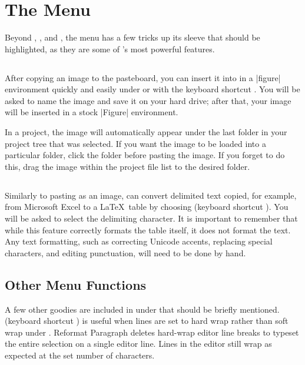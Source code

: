 \section[The Edit Menu]{The  Menu}
\label{reference.editmenu}
Beyond , , and , the  menu has a few tricks up its sleeve that should be highlighted, as they are some of \texnicle's most powerful features.

\subsection[Paste as Image]{}
\label{reference.edit.pasteimg}
After copying an image to the pasteboard, you can insert it into \texnicle in a |figure| environment quickly and easily under  or with the keyboard shortcut . You will be asked to name the image and save it on your hard drive; after that, your image will be inserted in a stock |Figure| environment.

In a project, the image will automatically appear under the last folder in your project tree that was selected. If you want the image to be loaded into a particular folder, click the folder before pasting the image. If you forget to do this, drag the image within the project file list to the desired folder.

\subsection[Paste as Table]{}
\label{reference.edit.pastetab}
Similarly to pasting as an image, \texnicle can convert delimited text copied, for example, from Microsoft Excel to a \LaTeX\ table by choosing  (keyboard shortcut ). You will be asked to select the delimiting character. It is important to remember that while this feature correctly formats the table itself, it does not format the text. Any text formatting, such as correcting Unicode accents, replacing special characters, and editing punctuation, will need to be done by hand.


\subsection[Other Edit Menu Functions]{Other  Menu Functions}
\label{reference.edit.other}
A few other goodies are included in under  that should be briefly mentioned.  (keyboard shortcut ) is useful when lines are set to hard wrap rather than soft wrap under . Reformat Paragraph deletes hard-wrap editor line breaks to typeset the entire selection on a single editor line. Lines in the editor still wrap as expected at the set number of characters.

